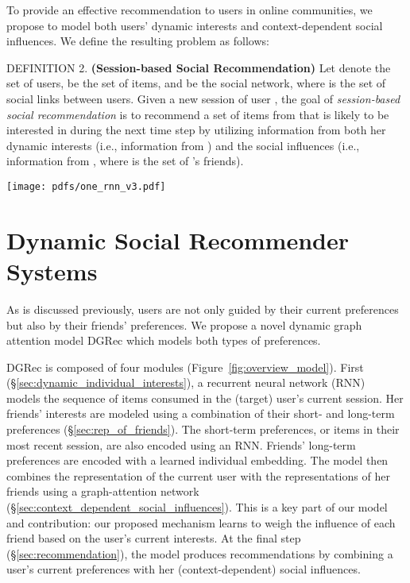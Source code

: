\documentclass[sigconf]{acmart}
\begin{document}
To provide an effective recommendation to users in online communities, we propose to model both users' dynamic interests and context-dependent social influences. We define the resulting problem as follows:

\textup{DEFINITION 2.} \textbf{(Session-based Social Recommendation)} Let  denote the set of users,  be the set of items, and  be the social network, where  is the set of social links between users. Given a new session  of user , the goal of \emph{session-based social recommendation} is to recommend a set of items from  that  is likely to be interested in during the next time step  by utilizing information from both her dynamic interests (i.e., information from ) and the social influences (i.e., information from , where  is the set of 's friends).
 
\begin{figure*}
\centering
\texttt{[image: pdfs/one\_rnn\_v3.pdf]}
\vspace{-8pt}
\caption{A schematic view of our proposed model for dynamic social recommendation. 
}
\label{fig:overview_model}
\end{figure*}

\section{Dynamic Social Recommender Systems}
As is discussed previously, users are not only guided by their current preferences but also by their friends' preferences. 
We propose a novel dynamic graph attention model \gls{DGRec} which models both types of preferences. 

\gls{DGRec} is composed of four modules (Figure~\ref{fig:overview_model}).
First (\S \ref{sec:dynamic_individual_interests}), a recurrent neural network (RNN)~\cite{elman1990finding} models the sequence of items consumed in the (target) user's current session. 
Her friends' interests are modeled using a combination of their short- and long-term preferences (\S \ref{sec:rep_of_friends}).
The short-term preferences, or items in their most recent session, are also encoded using an RNN. Friends' long-term preferences are encoded with a learned individual embedding.
The model then combines the representation of the current user with the representations of her friends using a graph-attention network (\S \ref{sec:context_dependent_social_influences}). This is a key part of our model and contribution: our proposed mechanism learns to weigh the influence of each friend based on the user's current interests.
At the final step (\S \ref{sec:recommendation}), the model produces recommendations by combining a user's current preferences with her (context-dependent) social influences.
\end{document}
